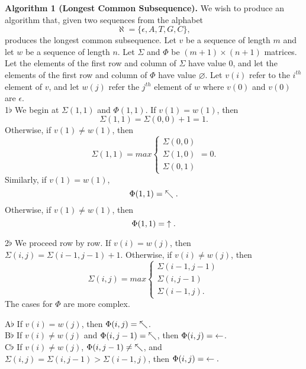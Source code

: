 \documentclass[a4paper]{article}
\begin{document}
\begin{adjustwidth}{.5in}{0pt}
\textbf{Algorithm 1 (Longest Common Subsequence).}
We wish to produce an algorithm that, given two sequences from the alphabet 
\[ \aleph = \{\epsilon, A,T,G,C\}, \] 
produces the longest common subsequence. Let $v$ be a sequence of length $m$ and let $w$ be a sequence of length $n$. Let $\Sigma$ and $\Phi$ be $(m+1) \times (n+1)$ matrices. Let the elements of the first row and column of $\Sigma$ have value $0$, and let the elements of the first row and column of $\Phi$ have value $\varnothing$. Let $v(i)$ refer to the $i^{th}$ element of $v$, and let $w(j)$ refer the $j^{th}$ element of $w$ where $v(0)$ and $v(0)$ are $\epsilon$. \\

1$\flat$ We begin at $\Sigma(1,1)$ and $\Phi(1,1)$. If $v(1) = w(1)$, then 
\[ \Sigma(1,1) = \Sigma(0,0) + 1 = 1. \] 
Otherwise, if $v(1) \neq w(1)$, then
\[ \Sigma(1,1) = max
\begin{cases}
\Sigma(0,0) \\
\Sigma(1,0) \\
\Sigma(0,1) 
\end{cases} = 0.  \] 
Similarly, if $v(1) = w(1)$,
\[ \Phi(1,1) = \hspace{1mm} \nwarrow. \]
Otherwise, if $v(1) \neq w(1)$, then
\[ \Phi(1,1) = \hspace{1mm} \uparrow. \]

2$\flat$ We proceed row by row. If $v(i) = w(j)$, then $\Sigma(i,j) = \Sigma(i-1,j-1) + 1$. Otherwise, if $v(i) \neq w(j)$, then
\[ \Sigma(i,j) = max
\begin{cases}
\Sigma(i-1,j-1) \\
\Sigma(i,j-1) \\
\Sigma(i-1,j). 
\end{cases} \] 
The cases for $\Phi$ are more complex. \\
\begin{adjustwidth}{.5in}{0pt}
A$\flat$ If $v(i) = w(j)$, then $\Phi(i,j) = \hspace{1mm} \nwarrow$. \\

B$\flat$ If $v(i) \neq w(j)$ and $\Phi(i,j-1) = \hspace{1mm} \nwarrow$, then $\Phi(i,j) = \hspace{1mm} \leftarrow$. \\

C$\flat$ If $v(i) \neq w(j)$, $\Phi(i,j-1) \neq \hspace{1mm} \nwarrow$, and $\Sigma(i,j) = \Sigma(i,j-1) > \Sigma(i-1,j)$, then $\Phi(i,j) = \hspace{1mm} \leftarrow.$ \\


\end{adjustwidth}
\end{adjustwidth}
\end{document}
